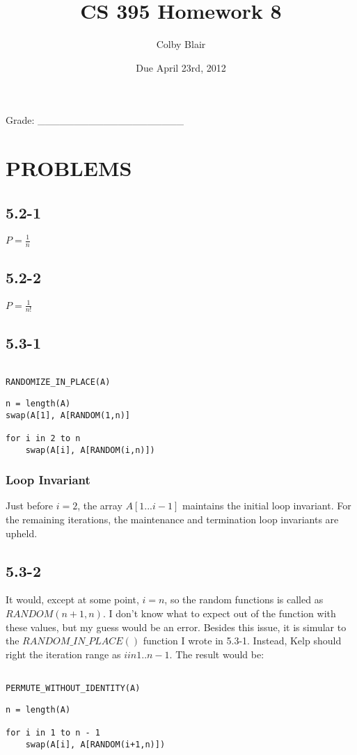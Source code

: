 \documentclass[11pt,letterpaper]{article}
\date{Due April 23rd, 2012}
\title{CS 395 Homework 8}
\author{Colby Blair}
\begin{document}
\maketitle

\begin{center}

Grade: \_\_\_\_\_\_\_\_\_\_\_\_\_\_\_\_\_\_\_\_
\end{center}

\thispagestyle{empty}

\pagebreak


\section*{PROBLEMS}

\subsection*{5.2-1}
$ P = \frac{1}{n} $


\subsection*{5.2-2}
$ P = \frac{1}{n!} $


\subsection*{5.3-1}
\begin{lstlisting}
						
RANDOMIZE_IN_PLACE(A)
\end{lstlisting}

\lstset{numbers=left}
\begin{lstlisting}
n = length(A)
swap(A[1], A[RANDOM(1,n)]

for i in 2 to n
	swap(A[i], A[RANDOM(i,n)])
\end{lstlisting}

\subsubsection*{Loop Invariant}
Just before  $ i = 2 $, the array $A[1...i-1]$ maintains the initial loop invariant. For the remaining iterations,
the maintenance and termination loop invariants are upheld.


\subsection*{5.3-2}
It would, except at some point, $ i = n $, so the random functions is called as $RANDOM(n+1, n)$. I
don't know what to expect out of the function with these values, but my guess would be an error. Besides
this issue, it is simular to the $RANDOM\_IN\_PLACE()$ function I wrote in 5.3-1. Instead, Kelp should right the iteration range as $ i in 1 .. n - 1 $. The result would be:

\begin{lstlisting}
						
PERMUTE_WITHOUT_IDENTITY(A)
\end{lstlisting}

\lstset{numbers=left}
\begin{lstlisting}
n = length(A)

for i in 1 to n - 1
	swap(A[i], A[RANDOM(i+1,n)])
\end{lstlisting}


\end{document}
